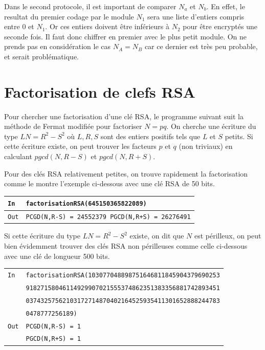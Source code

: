\documentclass[titlepage]{article}
\begin{document}
    Dans le second protocole, il est important de comparer $N_a$ et $N_b$. En effet, le resultat du premier codage par le module $N_1$ sera une liste d'entiers compris entre 0 et $N_1$. Or ces entiers doivent être inférieurs à $N_2$ pour être encryptés une seconde fois. Il faut donc chiffrer en premier avec le plus petit module.
    On ne prends pas en considération le cas $N_A=N_B$ car ce dernier est très peu probable, et serait problématique.

    \section{Factorisation de clefs RSA}
    Pour chercher une factorisation d'une clé RSA, le programme suivant suit la méthode de Fermat modifiée pour factoriser $N = pq$.
    On cherche une écriture du type $LN = R^2 - S^2$ où $L,R,S$ sont des entiers positifs tels que $L$ et $S$ petits.
    Si cette écriture existe, on peut trouver les facteurs $p$ et $q$ (non triviaux) en calculant $pgcd(N,R-S)$ et $ pgcd(N,R+S)$.

    

    Pour des clés RSA relativement petites, on trouve rapidement la factorisation comme le montre l'exemple ci-dessous avec une clé RSA de 50 bits. \bigbreak

    \begin{tabularx}{12cm}{|p{0.60cm}|X|}
        \hline
        \rowcolor{gray}
        \texttt{In}
        & 
        \texttt{factorisationRSA(645150365822089)}
        \\
        \hline
        \texttt{Out}
        &
        \texttt{PCGD(N,R-S) =  24552379 \newline
        PGCD(N,R+S) =  26276491}
        \\
        \hline
    \end{tabularx}
    \bigbreak
    
    Si cette écriture du type $LN = R^2 - S^2$ existe, on dit que $N$ est périlleux, on peut bien évidemment trouver des clés RSA non périlleuses comme celle ci-dessous avec une clé de longueur 500 bits.\bigbreak
    
    \begin{tabularx}{12cm}{|p{0.60cm}|X|}
        \hline
        \rowcolor{gray} \texttt{In} & \texttt{factorisationRSA(103077048898751646811845904379690253} \\
        \rowcolor{gray} & \texttt{91827158046114929907021555374862351383356881742893451} \\
        \rowcolor{gray} & \texttt{03743257562103172714870402164525935411301652888244783} \\
        \rowcolor{gray} & \texttt{0478777256189)} \\
        \hline
        \texttt{Out} & \texttt{PCGD(N,R-S) =  1} \\
        & \texttt{PGCD(N,R+S) =  1} \\
        \hline
    \end{tabularx}
    \bigbreak
    
\end{document}
